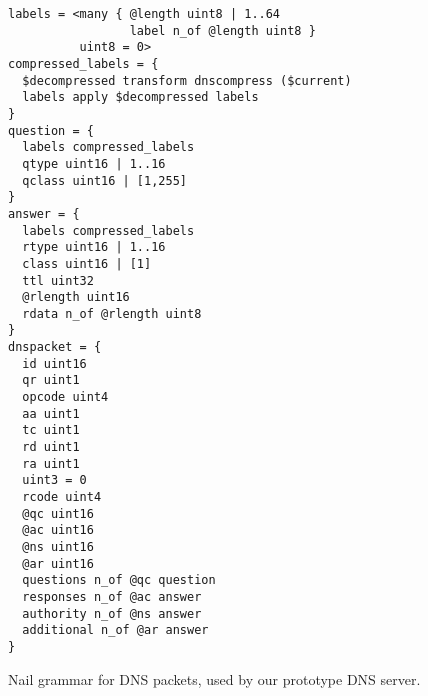 \begin{figure}
\smaller[0.5]
\begin{verbatim}
labels = <many { @length uint8 | 1..64
                 label n_of @length uint8 }
          uint8 = 0>
compressed_labels = {
  $decompressed transform dnscompress ($current)
  labels apply $decompressed labels
}
question = {
  labels compressed_labels
  qtype uint16 | 1..16
  qclass uint16 | [1,255]
}
answer = {
  labels compressed_labels
  rtype uint16 | 1..16
  class uint16 | [1]
  ttl uint32
  @rlength uint16
  rdata n_of @rlength uint8
}
dnspacket = {
  id uint16
  qr uint1
  opcode uint4
  aa uint1
  tc uint1
  rd uint1
  ra uint1
  uint3 = 0
  rcode uint4
  @qc uint16
  @ac uint16
  @ns uint16
  @ar uint16
  questions n_of @qc question
  responses n_of @ac answer
  authority n_of @ns answer
  additional n_of @ar answer
}
\end{verbatim}
\caption{Nail grammar for DNS packets, used by our prototype DNS server.}
\label{fig:dns-full}
\end{figure}
